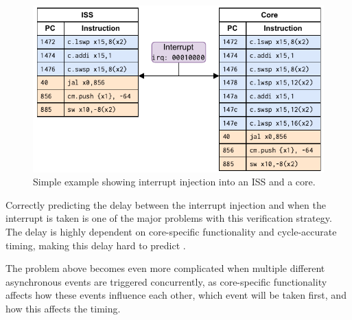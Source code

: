 \begin{figure}
    \centering
    \includegraphics[width=0.75\linewidth]{figures/lw_add_sw_example.pdf}
    \caption{Simple example showing interrupt injection into an ISS and a core.}
    \label{fig:lw_example}
\end{figure}



Correctly predicting the delay between the interrupt injection and when the interrupt is taken is one of the major problems with this verification strategy. The delay is highly dependent on core-specific functionality and cycle-accurate timing, making this delay hard to predict \cite{taylorAdvancedRISCVVerification2023}. 

The problem above becomes even more complicated when multiple different asynchronous events are triggered concurrently, as core-specific functionality affects how these events influence each other, which event will be taken first, and how this affects the timing. 






%



%
%


%    

